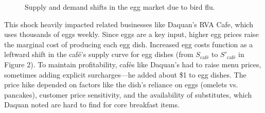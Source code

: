\documentclass[12pt]{article}
\begin{document}
\begin{doublespace}
\begin{figure}[H]
    \caption{Supply and demand shifts in the egg market due to bird flu.}
    \label{fig:egg_market}
  \end{figure}

  This shock heavily impacted related businesses like Daquan's RVA Cafe, which uses thousands of eggs weekly. Since eggs are a key input, higher egg prices raise the marginal cost of producing each egg dish. Increased egg costs function as a leftward shift in the café's supply curve for egg dishes (from $S_{\text{caf\'{e}}}$ to $S'_{\text{caf\'{e}}}$ in Figure 2). To maintain profitability, cafés like Daquan's had to raise menu prices, sometimes adding explicit surcharges—he added about \$1 to egg dishes. The price hike depended on factors like the dish's reliance on eggs (omelets vs. pancakes), customer price sensitivity, and the availability of substitutes, which Daquan noted are hard to find for core breakfast items.

  \begin{figure}[H]
    \centering
\end{figure}
\end{doublespace}
\end{document}
